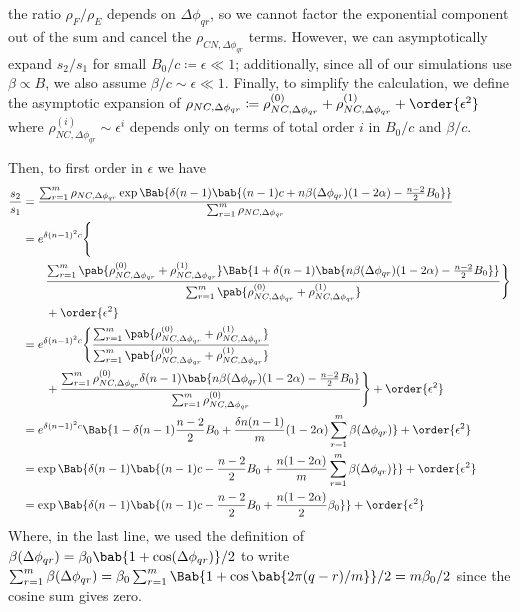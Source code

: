\documentclass[pdflatex,sn-nature,super]{sn-jnl}
\begin{document}
the ratio $\rho_F/\rho_E$ depends on $\Delta \phi_{qr}$,
so we cannot factor the exponential component out of the sum
and cancel the $\rho_{CN,\Delta \phi_{qr}}$ terms.
However, we can asymptotically expand $s_2/s_1$ for small
$B_0/c \coloneqq \epsilon \ll 1$;
additionally, since all of our simulations use $\beta \propto B$,
we also assume $\beta/c \sim \epsilon \ll 1$.
Finally, to simplify the calculation,
we define the asymptotic expansion of
$\rho_{NC,\Delta \phi_{qr}} \coloneqq
\rho_{NC,\Delta \phi_{qr}}^{(0)}
+
\rho_{NC,\Delta \phi_{qr}}^{(1)}
+
\order{\epsilon^2}
$
where
$
\rho_{NC,\Delta \phi_{qr}}^{(i)} \sim \epsilon^i
$
depends only on terms of total order $i$ in $B_0/c$ and $\beta/c$.

Then, to first order in $\epsilon$
we have
\begin{align*}
  \frac{s_2}{s_1}
  &=
  \frac
  {\sum_{r=1}^{m} \rho_{NC,\Delta \phi_{qr}}
    \exp \Bab{
      \delta (n-1)
      \bab{
        (n-1) c + n \beta(\Delta \phi_{qr}) (1 - 2 \alpha)
        - \frac{n-2}{2} B_0
      }
    }
  }
  {\sum_{r=1}^{m} \rho_{NC,\Delta \phi_{qr}}}
  \\
  &=
  e^{\delta (n-1)^2 c}
  \Biggl\{
  \\
  &\qquad
  \frac
  {\sum_{r=1}^{m}
    \pab{
      \rho_{NC,\Delta \phi_{qr}}^{(0)}
      +
      \rho_{NC,\Delta \phi_{qr}}^{(1)}
    }
    \Bab{1 +
      \delta (n-1)
      \bab{
        n \beta(\Delta \phi_{qr}) (1 - 2 \alpha)
        - \frac{n-2}{2} B_0
      }
    }
  }
  {\sum_{r=1}^{m} \pab{
    \rho_{NC,\Delta \phi_{qr}}^{(0)}
    +
    \rho_{NC,\Delta \phi_{qr}}^{(1)}
  }}
  \Biggr\}
  \\
  &\qquad
  + \order{\epsilon^2}
  \\
  &=
  e^{\delta (n-1)^2 c}
  \Biggl\{
  \frac
  {\sum_{r=1}^{m}
    \pab{
      \rho_{NC,\Delta \phi_{qr}}^{(0)}
      +
      \rho_{NC,\Delta \phi_{qr}}^{(1)}
    }
  }
  {\sum_{r=1}^{m} \pab{
    \rho_{NC,\Delta \phi_{qr}}^{(0)}
    +
    \rho_{NC,\Delta \phi_{qr}}^{(1)}
  }}
  \\
  &\qquad
  +
  \frac
  {\sum_{r=1}^{m} \rho_{NC,\Delta \phi_{qr}}^{(0)}
    \delta (n-1)
    \bab{
      n \beta(\Delta \phi_{qr}) (1 - 2 \alpha)
      - \frac{n-2}{2} B_0
    }
  }
  {\sum_{r=1}^{m} \rho_{NC,\Delta \phi_{qr}}^{(0)}
  }
  \Biggr\}
  + \order{\epsilon^2}
  \\
  &=
  e^{\delta (n-1)^2 c}
  \Bab{
    1
    - \delta (n-1) \frac{n-2}{2} B_0
    +
    \frac{\delta n (n-1)}{m} (1 - 2 \alpha)
    \sum_{r=1}^{m} \beta(\Delta \phi_{qr})
  }
  + \order{\epsilon^2}
  \\
  &=
  \exp \Bab{\delta (n-1) \bab{
    (n-1) c
    - \frac{n-2}{2} B_0
    +
    \frac{n (1 - 2 \alpha)}{m}
    \sum_{r=1}^{m} \beta(\Delta \phi_{qr})
  }}
  + \order{\epsilon^2}
  \\
  &=
  \exp \Bab{ \delta (n-1) \bab{
    (n-1) c
    - \frac{n-2}{2} B_0
    +
    \frac{n (1 - 2 \alpha)}{2} \beta_0
  }}
  + \order{\epsilon^2}
\end{align*}
Where, in the last line, we used
the definition of
$\beta(\Delta \phi_{qr}) = \beta_0 \bab{1 + \cos(\Delta \phi_{qr})}/2$
to write
$\sum_{r=1}^m \beta(\Delta \phi_{qr})
= \beta_0 \sum_{r=1}^m \Bab{1 + \cos\bab{2 \pi (q-r)/m}}/2
= m \beta_0/2$
since the cosine sum gives zero.
\end{document}
